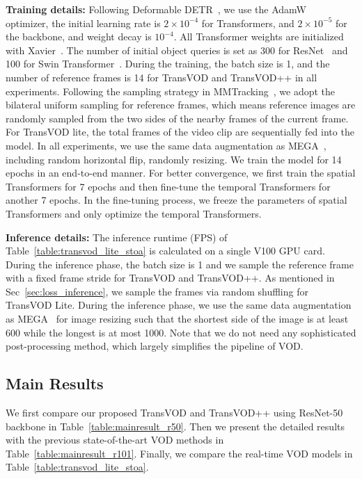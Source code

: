 \documentclass[10pt,journal,compsoc]{IEEEtran}
\begin{document}
\noindent 
\textbf{Training details:} 
Following Deformable DETR~\cite{zhu2020deformable}, we use the  AdamW~\cite{loshchilov2017decoupled} optimizer, the initial learning rate is $2\times 10^{-4}$ for Transformers, and $2\times 10^{-5}$ for the backbone, and weight decay is $10^{-4}$. All Transformer weights are initialized with Xavier~\cite{glorot2010understanding}. 
The number of initial object queries is set as 300 for ResNet~\cite{he16res} and 100 for Swin Transformer~\cite{liu2021swin}.
During the training, the batch size is 1, and
the number of reference frames is 14 for TransVOD and TransVOD++ in all experiments.
Following the sampling strategy in MMTracking~\cite{mmtrack2020}, we adopt the bilateral uniform sampling for reference frames, which means reference images are randomly
sampled from the two sides of the nearby frames of the current frame.
For TransVOD lite, the total frames of the video clip are sequentially fed into the model. In all experiments, we use the same data augmentation as MEGA~\cite{chen2020memory}, including random horizontal flip, randomly resizing. We train the model for 14 epochs in an end-to-end manner. For better convergence, we first train the spatial Transformers for 7 epochs and then fine-tune the temporal Transformers for another 7 epochs. In the fine-tuning process, we freeze the parameters of spatial Transformers and only optimize the temporal Transformers.




\noindent 
\textbf{Inference details:} 
The inference runtime (FPS) of Table~\ref{table:transvod_lite_stoa} is calculated on a single V100 GPU card. During the inference phase, the batch size is 1 and we sample the reference frame with a fixed frame stride for TransVOD and TransVOD++. As mentioned in Sec~\ref{sec:loss_inference}, we sample the frames via random shuffling for TransVOD Lite.
During the inference phase, we use the same data augmentation as MEGA~\cite{chen2020memory} for image resizing such that the shortest side of the image is at least 600 while the longest is at most 1000. 
Note that we do not need any sophisticated post-processing method, which largely simplifies the pipeline of VOD. 



\subsection{Main Results}

We first compare our proposed TransVOD and TransVOD++ using ResNet-50 backbone in Table~\ref{table:mainresult_r50}. Then we present the detailed results with the previous state-of-the-art VOD methods in Table~\ref{table:mainresult_r101}. Finally, we compare the real-time VOD models in Table~\ref{table:transvod_lite_stoa}.
\end{document}
